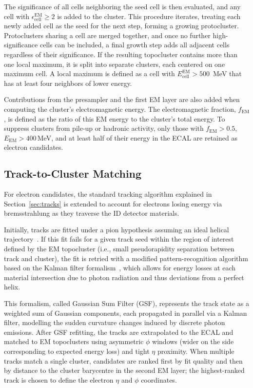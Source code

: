 The significance of all cells neighboring the seed cell is then evaluated, and any cell with $\epsilon_{\text{cell}}^{\text{EM}} \geq 2$ is added to the cluster. This procedure iterates, treating each newly added cell as the seed for the next step, forming a growing protocluster. Protoclusters sharing a cell are merged together, and once no further high-significance cells can be included, a final growth step adds all adjacent cells regardless of their significance. If the resulting topocluster contains more than one local maximum, it is split into separate clusters, each centered on one maximum cell. A local maximum is defined as a cell with \(E_{\text{cell}}^{\text{EM}}>500\)~MeV that has at least four neighbors of lower energy.

Contributions from the presampler and the first EM layer are also added when computing the cluster’s electromagnetic energy. The electromagnetic fraction, \(f_{\text{EM}}\), is defined as the ratio of this EM energy to the cluster’s total energy. To suppress clusters from pile-up or hadronic activity, only those with \(f_{\text{EM}}>0.5\), \(E_{\text{EM}}>400\)\,MeV, and at least half of their energy in the ECAL are retained as electron candidates.  

\subsection{Track-to-Cluster Matching}

For electron candidates, the standard tracking algorithm explained in Section~\ref{sec:tracks} is extended to account for electrons losing energy via bremsstrahlung as they traverse the ID detector materials. 

Initially, tracks are fitted under a pion hypothesis assuming an ideal helical trajectory~\cite{tracks}. If this fit fails for a given track seed within the region of interest defined by the EM topocluster (i.e., small pseudorapidity separation between track and cluster), the fit is retried with a modified pattern-recognition algorithm based on the Kalman filter formalism~\cite{FRUHWIRTH1987444}, which allows for energy losses at each material intersection due to photon radiation and thus deviations from a perfect helix.

This formalism, called Gaussian Sum Filter (GSF), represents the track state as a weighted sum of Gaussian components, each propagated in parallel via a Kalman filter, modelling the sudden curvature changes induced by discrete photon emissions. After GSF refitting, the tracks are extrapolated to the ECAL and matched to EM topoclusters using asymmetric $\phi$ windows (wider on the side corresponding to expected energy loss) and tight $\eta$ proximity. When multiple tracks match a single cluster, candidates are ranked first by fit quality and then by distance to the cluster barycentre in the second EM layer; the highest-ranked track is chosen to define the electron $\eta$ and $\phi$ coordinates.


